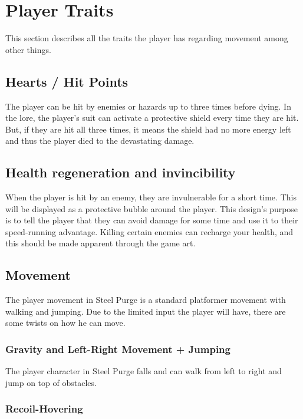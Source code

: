 \documentclass[../Main.tex]{subfiles}
\begin{document}
\section{Player Traits}

This section describes all the traits the player has regarding movement among other things.

\subsection{Hearts / Hit Points}

The player can be hit by enemies or hazards up to three times before dying. In the lore, the player's suit can activate a protective shield every time they are hit. But, if they are hit all three times, it means the shield had no more energy left and thus the player died to the devastating damage. 


\subsection{Health regeneration and invincibility}

When the player is hit by an enemy, they are invulnerable for a short time. This will be displayed as a protective bubble around the player. This design's purpose is to tell the player that they can avoid damage for some time and use it to their speed-running advantage. Killing certain enemies can recharge your health, and this should be made apparent through the game art. 

\subsection{Movement}

The player movement in Steel Purge is a standard platformer movement with walking and jumping. Due to the limited input the player will have, there are some twists on how he can move.

\subsubsection{Gravity and Left-Right Movement + Jumping}

The player character in Steel Purge falls and can walk from left to right and jump on top of obstacles.

\subsubsection{Recoil-Hovering}
\end{document}
